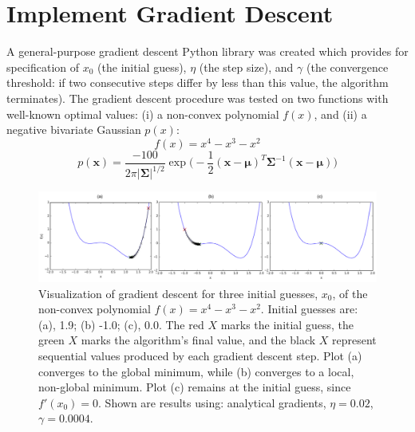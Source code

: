 \documentclass[10pt]{article}
\begin{document}
 



\section{Implement Gradient Descent}
A general-purpose gradient descent Python library was created which provides for specification of $x_0$ (the initial guess), $\eta$ (the step size), and $\gamma$ (the convergence threshold: if two consecutive steps differ by less than this value, the algorithm terminates).  The gradient descent procedure was tested on two functions with well-known optimal values: (i)  a non-convex polynomial $f(x)$, and (ii) a negative bivariate Gaussian $p(x)$:
$$f(x) = x^4 - x^3 -x^2$$
$$p(\mathbf{x}) = \frac{-100}{2\pi|\mathbf{\Sigma}|^{1/2}}\exp{\bigg(-\frac{1}{2} (\mathbf{x} - \boldsymbol{\mu})^T\mathbf{\Sigma}^{-1} (\mathbf{x} - \boldsymbol{\mu}) \bigg)}$$

\begin{figure}[!ht]
\centering
\includegraphics[scale=0.9]{polynomialdescent.pdf}
\caption{Visualization of gradient descent for three initial guesses, $x_0$, of the non-convex polynomial $f(x) = x^4 - x^3 -x^2$.  Initial guesses are: (a), 1.9; (b) -1.0; (c), 0.0.  The red $X$ marks the initial guess, the green $X$ marks the algorithm's final value, and the black $X$ represent sequential values produced by each gradient descent step. Plot (a) converges to the global minimum, while (b) converges to a local, non-global minimum.  Plot (c) remains at the initial guess, since $f'(x_0)=0$. Shown are results using: analytical gradients, $\eta = 0.02$, $\gamma = 0.0004$.}
\label{poly}
\end{figure}
\end{document}

